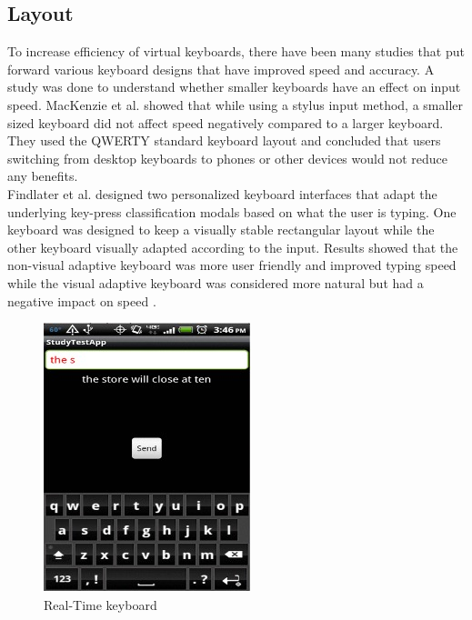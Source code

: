 \documentclass{vgtc}                          %
\begin{document}
\subsection{Layout}
To increase efficiency of virtual keyboards, there have been many studies that put forward various keyboard designs that have improved speed and accuracy. A study was done to understand whether smaller keyboards have an effect on input speed. MacKenzie et al. \cite{Mackenzie:2015} showed that while using a stylus input method, a smaller sized keyboard did not affect speed negatively compared to a larger keyboard. They used the QWERTY standard keyboard layout and concluded that users switching from desktop keyboards to phones or other devices would not reduce any benefits.\\[1em]
Findlater et al. \cite{findlater:2012} designed two personalized keyboard interfaces that adapt the underlying key-press classification modals based on what the user is typing. One keyboard was designed to keep a visually stable rectangular layout while the other keyboard visually adapted according to the input. Results showed that the non-visual adaptive keyboard was more user friendly and improved typing speed while the visual adaptive keyboard was considered more natural but had a negative impact on speed \cite{findlater:2012}.
\begin{figure}[h!]
 \centering %
 \includegraphics[width=\columnwidth]{rt.jpg}
 \caption{Real-Time keyboard}
 \label{fig:rt}
\end{figure}
\end{document}
